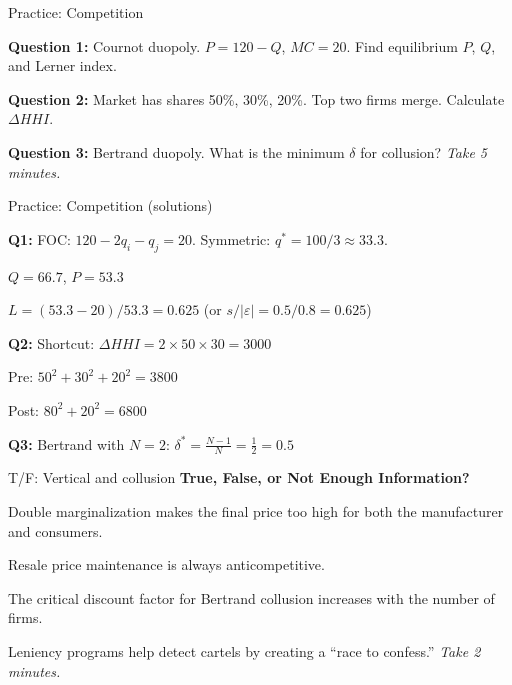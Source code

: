 \documentclass[notes,11pt, aspectratio=169]{beamer}
\newenvironment{wideitemize}{\itemize\addtolength{\itemsep}{10pt}}{\enditemize}
\newenvironment{wideenumerate}{\enumerate\addtolength{\itemsep}{10pt}}{\endenumerate}
\begin{document}
\begin{frame}{Practice: Competition}
	\begin{wideitemize}
		\item \textbf{Question 1:} Cournot duopoly. $P = 120 - Q$, $MC = 20$. Find equilibrium $P$, $Q$, and Lerner index.
		\item \textbf{Question 2:} Market has shares 50\%, 30\%, 20\%. Top two firms merge. Calculate $\Delta HHI$.
		\item \textbf{Question 3:} Bertrand duopoly. What is the minimum $\delta$ for collusion?
	\end{wideitemize}
	\vspace{10pt}
	\centering
	\textit{Take 5 minutes.}
\end{frame}

\begin{frame}{Practice: Competition (solutions)}
	\begin{wideitemize}
		\item \textbf{Q1:} FOC: $120 - 2q_i - q_j = 20$. Symmetric: $q^* = 100/3 \approx 33.3$.
		\begin{wideitemize}
			\vspace{3pt}
			\item $Q = 66.7$, $P = 53.3$
			\item $L = (53.3 - 20)/53.3 = 0.625$ (or $s/|\varepsilon| = 0.5/0.8 = 0.625$)
		\end{wideitemize}
		\item \textbf{Q2:} Shortcut: $\Delta HHI = 2 \times 50 \times 30 = 3000$
		\begin{wideitemize}
			\vspace{3pt}
			\item Pre: $50^2 + 30^2 + 20^2 = 3800$
			\item Post: $80^2 + 20^2 = 6800$
		\end{wideitemize}
		\item \textbf{Q3:} Bertrand with $N = 2$: $\delta^* = \frac{N-1}{N} = \frac{1}{2} = 0.5$
	\end{wideitemize}
\end{frame}

\begin{frame}{T/F: Vertical and collusion}
	\textbf{True, False, or Not Enough Information?}
	\vspace{8pt}
	\begin{wideenumerate}
		\item Double marginalization makes the final price too high for both the manufacturer and consumers.
		\item Resale price maintenance is always anticompetitive.
		\item The critical discount factor for Bertrand collusion increases with the number of firms.
		\item Leniency programs help detect cartels by creating a ``race to confess.''
	\end{wideenumerate}
	\vspace{8pt}
	\centering
	\textit{Take 2 minutes.}
\end{frame}
\end{document}
